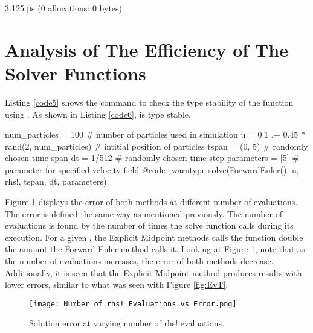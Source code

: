 \documentclass{article}
\begin{document}
{\LARGE
\begin{jllisting}[caption={Type stable check output.}, label=code4]
3.125 μs (0 allocations: 0 bytes)
\end{jllisting}
}

\section{Analysis of The Efficiency of The Solver Functions}

Listing \ref{code5} shows the command to check the type stability of the  function using . As shown in Listing \ref{code6},  is type stable.

{\LARGE
\begin{jllisting}[caption={Type stable check command.}, label=code5]
num_particles = 100 # number of particles used in simulation
u = 0.1 .+ 0.45 * rand(2, num_particles) # intitial position of particles
tspan = (0, 5) # randomly chosen time span
dt = 1/512 # randomly chosen time step
parameters = [5] # parameter for specified velocity field
@code_warntype solve(ForwardEuler(), u, rhs!, tspan, dt, parameters)
\end{jllisting}
}

{\LARGE
{}
}

Figure \ref{fig:EvN} displays the error of both methods at different number of  evaluations. The error is defined the same way as mentioned previously. The number of  evaluations is found by the number of times the solve function calls  during its execution. For a given , the Explicit Midpoint methods calls the  function double the amount the Forward Euler method calls it. Looking at Figure \ref{fig:EvN}, note that as the number of  evaluations increases, the error of both methods decrease. Additionally, it is seen that the Explicit Midpoint method produces results with lower errors, similar to what was seen with Figure \ref{fig:EvT}.

\begin{figure}[h!]
  \centering
  \texttt{[image: Number of rhs! Evaluations vs Error.png]}
  \caption{Solution error at varying number of rhs! evaluations.}
  \label{fig:EvN}
\end{figure}
\end{document}
